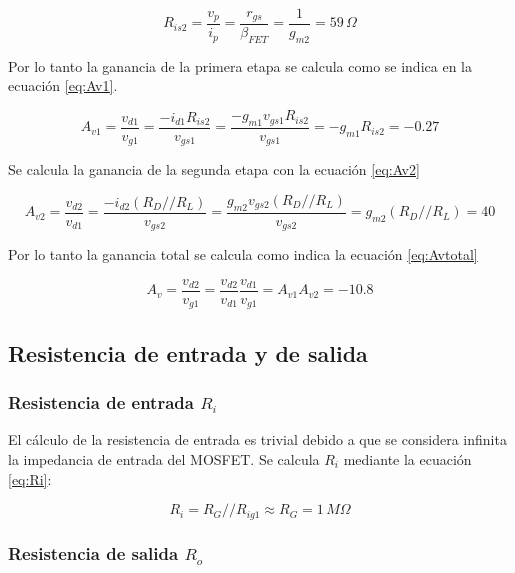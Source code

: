 \documentclass[10pt,spanish,a4paper,notitlepage]{article}
\begin{document}
\begin{equation}
     R_{is2}= \frac{v_p}{i_p}= \frac{r_{gs}}{\beta_{FET}}=\frac{1}{g_{m2}}= 59\,\unit{\Omega}
     \label{eq:Ris22}
\end{equation}

Por lo tanto la ganancia de la primera etapa se calcula como se indica en la ecuación \ref{eq:Av1}.

\begin{equation}
     A_{v1}=\frac{v_{d1}}{v_{g1}}=\frac{-i_{d1}R_{is2}}{v_{gs1}}=\frac{-g_{m1}v_{gs1}R_{is2}}{v_{gs1}}=-g_{m1}R_{is2}=-0.27
     \label{eq:Av1}
\end{equation}

Se calcula la ganancia de la segunda etapa con la ecuación \ref{eq:Av2}

\begin{equation}
     A_{v2}=\frac{v_{d2}}{v_{d1}}=\frac{-i_{d2}(R_{D}//R_{L})}{v_{gs2}}=\frac{g_{m2}v_{gs2}(R_{D}//R_{L})}{v_{gs2}}=g_{m2}(R_{D}//R_{L})=40
     \label{eq:Av2}
\end{equation}

Por lo tanto la ganancia total se calcula como indica la ecuación \ref{eq:Avtotal}

\begin{equation}
     A_{v}=\frac{v_{d2}}{v_{g1}}=\frac{v_{d2}}{v_{d1}} \frac{v_{d1}}{v_{g1}}= A_{v1}A_{v2}=-10.8
     \label{eq:Avtotal}
\end{equation}

\subsection{Resistencia de entrada y de salida}

\subsubsection{Resistencia de entrada \texorpdfstring{$R_i$}{TEXT}}

El cálculo de la resistencia de entrada es trivial debido a que se 
considera  infinita la impedancia de entrada del MOSFET. Se calcula
$R_i$ mediante la ecuación \ref{eq:Ri}:

\begin{equation}
    R_{i}=R_G//R_{ig1} \approx R_G=1\,\unit{M\Omega}
    \label{eq:Ri}
\end{equation}

\subsubsection{Resistencia de salida \texorpdfstring{$R_o$}{TEXT}}
\end{document}
